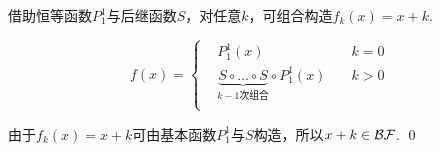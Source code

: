 \begin{pf} \rm 
    借助恒等函数$P_1^1$与后继函数$S$，对任意$k$，可组合构造$f_k(x)=x+k$.

    $$ f(x)=\left\{
        \begin{aligned}
        &P_1^1(x)   & k=0 \\
        &\underbrace{S\circ \dots \circ S}_{k-1次组合} \circ P_1^1(x) \quad & k>0 \\
        \end{aligned}
    \right.
    $$

    由于$f_k(x) = x+k$可由基本函数$P_1^1$与$S$构造，所以$x+k\in\mathcal{BF}$.
    \qed
\end{pf}
